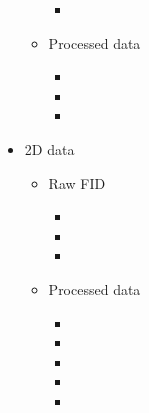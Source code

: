 \documentclass[letterpaper,10pt,english]{sphinxmanual}
\begin{document}
\begin{fulllineitems}
\begin{itemize}
\begin{itemize}
\begin{itemize}
\item {} 
\sphinxAtStartPar
{}

\end{itemize}

\item {} 
\sphinxAtStartPar
Processed data
\begin{itemize}
\item {} 
\sphinxAtStartPar
{}

\item {} 
\sphinxAtStartPar
{}

\item {} 
\sphinxAtStartPar
{}

\end{itemize}

\end{itemize}

\item {} 
\sphinxAtStartPar
2D data
\begin{itemize}
\item {} 
\sphinxAtStartPar
Raw FID
\begin{itemize}
\item {} 
\sphinxAtStartPar
{}

\item {} 
\sphinxAtStartPar
{}

\item {} 
\sphinxAtStartPar
{}

\end{itemize}

\item {} 
\sphinxAtStartPar
Processed data
\begin{itemize}
\item {} 
\sphinxAtStartPar
{}

\item {} 
\sphinxAtStartPar
{}

\item {} 
\sphinxAtStartPar
{}

\item {} 
\sphinxAtStartPar
{}

\item {} 
\sphinxAtStartPar
{}


\end{itemize}
\end{itemize}
\end{itemize}
\end{fulllineitems}
\end{document}
